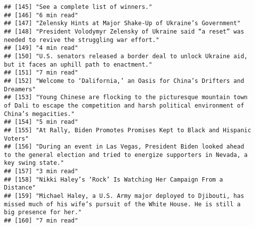 \documentclass[
]{article}
\begin{document}
\begin{verbatim}
## [145] "See a complete list of winners."                                                                                                                          
## [146] "6 min read"                                                                                                                                               
## [147] "Zelensky Hints at Major Shake-Up of Ukraine’s Government"                                                                                                 
## [148] "President Volodymyr Zelensky of Ukraine said “a reset” was needed to revive the struggling war effort."                                                   
## [149] "4 min read"                                                                                                                                               
## [150] "U.S. senators released a border deal to unlock Ukraine aid, but it faces an uphill path to enactment."                                                    
## [151] "7 min read"                                                                                                                                               
## [152] "Welcome to ‘Dalifornia,’ an Oasis for China’s Drifters and Dreamers"                                                                                      
## [153] "Young Chinese are flocking to the picturesque mountain town of Dali to escape the competition and harsh political environment of China’s megacities."     
## [154] "5 min read"                                                                                                                                               
## [155] "At Rally, Biden Promotes Promises Kept to Black and Hispanic Voters"                                                                                      
## [156] "During an event in Las Vegas, President Biden looked ahead to the general election and tried to energize supporters in Nevada, a key swing state."        
## [157] "3 min read"                                                                                                                                               
## [158] "Nikki Haley’s ‘Rock’ Is Watching Her Campaign From a Distance"                                                                                            
## [159] "Michael Haley, a U.S. Army major deployed to Djibouti, has missed much of his wife’s pursuit of the White House. He is still a big presence for her."     
## [160] "7 min read"                                                                                                                                               

\end{verbatim}
\end{document}
